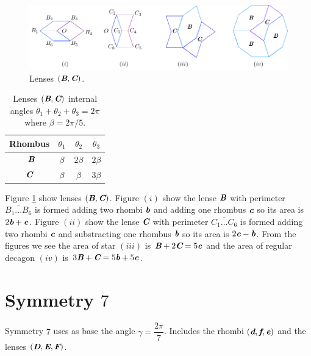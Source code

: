 \documentclass[11pt]{article}
\def\mathbi#1{\textbf{\em #1}}
\begin{document}
\begin{figure}[H]
\centering
\includegraphics[scale=1.1]{bc/hexagons}
\caption{Lenses $(\mathbi{B}, \mathbi{C})$.}
\label{fig:bc-hexagons}
\end{figure}

\begin{table}[H]
\begin{center}
\begin{tabular}{|c|c c c|}
\hline
Rhombus & $\theta_1$ & $\theta_2$ & $\theta_3$ \\ %
\hline\
$\mathbi{B}$ & $\beta$ & $2\beta$ & $2\beta$ \\[0.5ex] \hline
$\mathbi{C}$ & $\beta$ & $\beta$ & $3\beta$ \\[0.5ex] \hline
\end{tabular}
\caption{Lenses $(\mathbi{B},\mathbi{C})$ internal angles $\theta_1+\theta_2+\theta_3 = 2\pi$ where $\beta = 2\pi/5$.} 
\label{tbl:bc-lenses-angles}
\end{center}
\end{table}


Figure \ref{fig:bc-hexagons} show lenses $(\mathbi{B},\mathbi{C})$.
Figure $(i)$ show the lense $\mathbi{B}$ with perimeter $\overline{B_1...B_6}$ is formed adding two rhombi $\mathbi{b}$ and adding one rhombus $\mathbi{c}$ so its area is $2\mathbi{b} + \mathbi{c}$.
Figure $(ii)$ show the lense $\mathbi{C}$ with perimeter $\overline{C_1...C_6}$ is formed adding two rhombi $\mathbi{c}$ and substracting one rhombus $\mathbi{b}$ so its area is $2\mathbi{c} - \mathbi{b}$.
From the figures we see the area of star $(iii)$ is $\mathbi{B} + 2\mathbi{C} = 5\mathbi{c}$
and the area of regular decagon $(iv)$ is $3\mathbi{B} + \mathbi{C} = 5\mathbi{b} + 5\mathbi{c}$.

\section{Symmetry $7$}

Symmetry $7$ uses as base the angle $\gamma = \dfrac{2\pi}7$. Includes the rhombi $(\mathbi{d},\mathbi{f},\mathbi{e})$ and the lenses $(\mathbi{D},\mathbi{E},\mathbi{F})$.
\end{document}
